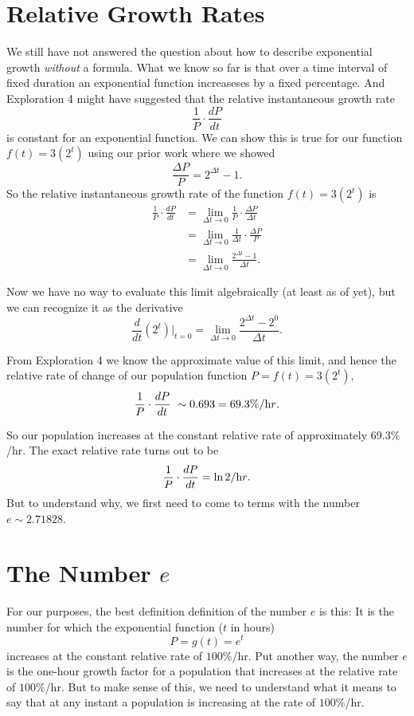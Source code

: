 \documentclass{ximera}
\begin{document}
\section{Relative Growth Rates}
We still have not answered the question about how to describe exponential growth \emph{without} a formula. What we know so far is that over a time interval of fixed duration an exponential function increaseses by a fixed percentage.  And Exploration 4 might have suggested that the relative instantaneous growth rate 
\[
  \frac{1}{P}\cdot \frac{dP}{dt}
\]
is constant for an exponential function. We can show this is true for our function $f(t)=3(2^t)$ using our prior work where we showed 
\[
  \frac{\Delta P}{P} = 2^{\Delta t} - 1 .
\]
So the relative instantaneous growth rate of the function $f(t)=3(2^t)$ is 
\begin{align*}
      \frac{1}{P}\cdot \frac{dP}{dt} &= \lim_{\Delta t\to  0} \frac{1}{P} \cdot \frac{\Delta P}{\Delta t} \\
                                                   &= \lim_{\Delta t\to  0} \frac{1}{\Delta t} \cdot \frac{\Delta P}{P} \\
                                                   &=  \lim_{\Delta t\to  0}  \frac{2^{\Delta t} - 1}{\Delta t} .
\end{align*}

Now we have no way to evaluate this limit algebraically (at least as of yet), but we can recognize it as the derivative
\[
     \frac{d}{dt}\left ( 2^ t \right) \Big|_{t=0} = \lim_{\Delta t\to  0}  \frac{2^{\Delta t} - 2^0}{\Delta t} .
\]

From Exploration 4 we know the approximate value of this limit, and hence the relative rate of change of our population function $P = f(t) = 3(2^t)$, 
\[
        \frac{1}{P}\cdot \frac{dP}{dt} ~\sim 0.693 = 69.3\% / {\text hr}.
\]

So our population increases at the constant relative rate of approximately $69.3\%$/hr. The exact relative rate turns out to be
\[
  \frac{1}{P}\cdot \frac{dP}{dt} = \ln 2 / {\text hr}.
\]
But to understand why, we first need to come to terms with the number $e\sim 2.71828$.


\section{The Number $e$}

For our purposes, the best definition definition of the number $e$ is this: It is the number for which the exponential function ($t$ in hours)
\[
     P = g(t) = e^t 
\]
increases at the constant relative rate of $100\%$/hr. Put another way, the number $e$ is the one-hour growth factor for a population that increases at the relative rate of $100\%$/hr. But to make sense of this, we need to understand what it means to say that at any instant a population is increasing at the rate of  $100\%$/hr.
\end{document}
